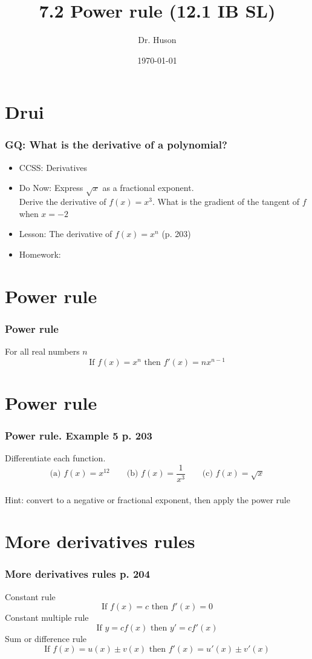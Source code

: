 \documentclass{beamer}
\title{7.2 Power rule (12.1 IB SL)}
\author{Dr. Huson}
\date{\today}
\begin{document}
\frame{\titlepage}

\section[Outline]{}
\frame{\tableofcontents}

\section{Drui}
\frame
{
  \frametitle{GQ: What is the derivative of a polynomial?}

  \begin{itemize}
  \item CCSS: Derivatives
  \item Do Now: Express $\sqrt{x}$ as a fractional exponent.\\
  Derive the derivative of $f(x)=x^3$. What is the gradient of the tangent of $f$ when $x=-2$
  \item Lesson: The derivative of $f(x)=x^n$ (p. 203)
  \item Homework:     
  \end{itemize}
}

\section{Power rule}
\frame
{
  \frametitle{Power rule}
  For all real numbers $n$\\
  \[\text{If } f(x)=x^n \text{ then } f'(x)=nx^{n-1}\]
}

\section{Power rule}
\frame
{
  \frametitle{Power rule. Example 5 p. 203}
  Differentiate each function.
  \[\text{(a) } f(x)=x^{12} \qquad \text{(b) } f(x)=\frac{1}{x^3}\qquad \text{(c) } f(x)=\sqrt{x}\]\\[45pt]
  Hint: convert to a negative or fractional exponent, then apply the power rule
}

\section{More derivatives rules}
\frame
{
  \frametitle{More derivatives rules p. 204}
  Constant rule\\
  \[\text{If } f(x)=c \text{ then } f'(x)=0\]
  Constant multiple rule\\
  \[\text{If } y=cf(x) \text{ then } y'=cf'(x)\]
  Sum or difference rule\\
  \[\text{If } f(x)=u(x) \pm v(x) \text{ then } f'(x)=u'(x) \pm v'(x)\]

}
\end{document}
